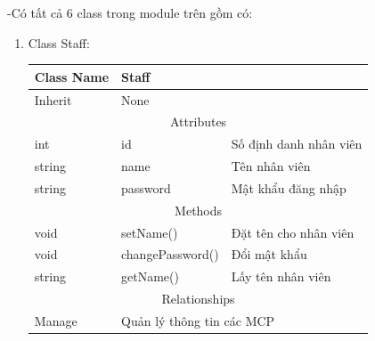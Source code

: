     \newpage
    -Có tất cả 6 class trong module trên gồm có:
    \begin{enumerate}
        \item Class Staff:
        \begin{table}[htp]
            \begin{tabular}{|lll|}
                \hline
                \multicolumn{1}{|l|}{Class Name} & \multicolumn{2}{l|}{Staff}                                     \\ \hline
                \multicolumn{1}{|l|}{Inherit}    & \multicolumn{2}{l|}{None}                                      \\ \hline
                \multicolumn{3}{|c|}{\cellcolor[HTML]{FFFFC7}Attributes}                                          \\ \hline
                \multicolumn{1}{|l|}{int}        & \multicolumn{1}{l|}{id}               & Số định danh nhân viên \\ \hline
                \multicolumn{1}{|l|}{string}     & \multicolumn{1}{l|}{name}             & Tên nhân viên          \\ \hline
                \multicolumn{1}{|l|}{string}     & \multicolumn{1}{l|}{password}         & Mật khẩu đăng nhập     \\ \hline
                \multicolumn{3}{|c|}{\cellcolor[HTML]{FFFFC7}Methods}                                             \\ \hline
                \multicolumn{1}{|l|}{void}       & \multicolumn{1}{l|}{setName()}        & Đặt tên cho nhân viên  \\ \hline
                \multicolumn{1}{|l|}{void}       & \multicolumn{1}{l|}{changePassword()} & Đổi mật khẩu           \\ \hline
                \multicolumn{1}{|l|}{string}     & \multicolumn{1}{l|}{getName()}        & Lấy tên nhân viên      \\ \hline
                \multicolumn{3}{|c|}{\cellcolor[HTML]{FFFFC7}Relationships}                                       \\ \hline
                \multicolumn{1}{|l|}{Manage}     & \multicolumn{2}{l|}{Quản lý thông tin các MCP}                 \\ \hline
            \end{tabular}
        \end{table}
                

\end{enumerate}
